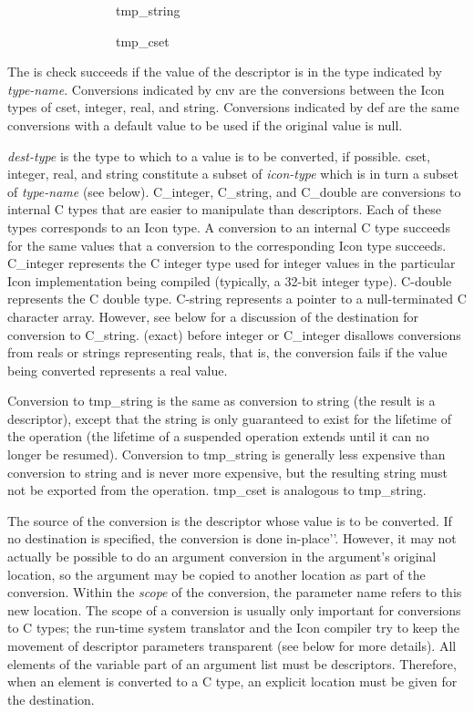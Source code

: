{\ttfamily\mdseries
\ \ \ \ \ \ \ \ \ \ \ \ \ \ \ \ \ tmp\_string {\textbar}}

{\ttfamily\mdseries
\ \ \ \ \ \ \ \ \ \ \ \ \ \ \ \ \ tmp\_cset}


The is check succeeds if the value of the descriptor is in the type
indicated by \textit{type-name}. Conversions indicated by cnv are the
conversions between the Icon types of cset, integer, real, and
string. Conversions indicated by def are the same conversions with a
default value to be used if the original value is null.

\textit{dest-type} is the type to which to a value is to be converted,
if possible. cset, integer, real, and string constitute a subset of
\textit{icon-type} which is in turn a subset of \textit{type-name}
(see below). C\_integer, C\_string, and C\_double are conversions to
internal C types that are easier to manipulate than descriptors. Each
of these types corresponds to an Icon type. A conversion to an
internal C type succeeds for the same values that a conversion to the
corresponding Icon type succeeds. C\_integer represents the C integer
type used for integer values in the particular Icon implementation
being compiled (typically, a 32-bit integer type). C-double represents
the C double type. C-string represents a pointer to a null-terminated
C character array. However, see below for a discussion of the
destination for conversion to C\_string. (exact) before integer or
C\_integer disallows conversions from reals or strings representing
reals, that is, the conversion fails if the value being converted
represents a real value.

Conversion to tmp\_string is the same as conversion to string (the
result is a descriptor), except that the string is only guaranteed to
exist for the lifetime of the operation (the lifetime of a suspended
operation extends until it can no longer be resumed). Conversion to
tmp\_string is generally less expensive than conversion to string and
is never more expensive, but the resulting string must not be exported
from the operation. tmp\_cset is analogous to tmp\_string.

The source of the conversion is the descriptor whose value is to be
converted. If no destination is specified, the conversion is done
{\textasciigrave}{\textasciigrave}in-place'{}'. However, it may not
actually be possible to do an argument conversion in the argument's
original location, so the argument may be copied to another location
as part of the conversion. Within the \textit{scope} of the
conversion, the parameter name refers to this new location. The scope
of a conversion is usually only important for conversions to C types;
the run-time system translator and the Icon compiler try to keep the
movement of descriptor parameters transparent (see below for more
details). All elements of the variable part of an argument list must
be descriptors. Therefore, when an element is converted to a C type,
an explicit location must be given for the destination.

